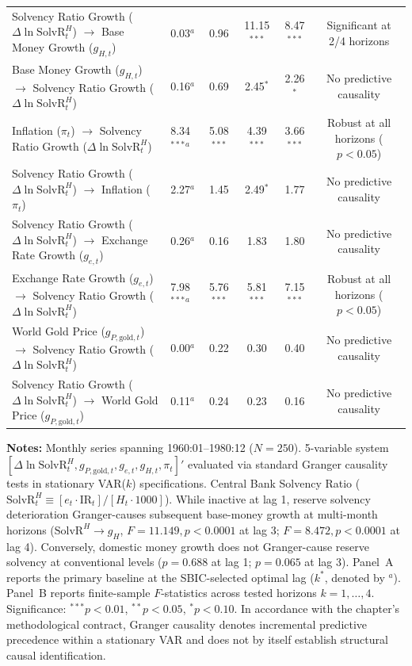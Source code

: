\begin{table}[htbp]
{\begin{tabular}{llccccc}
\midrule
Solvency Ratio Growth ($\Delta \ln \text{SolvR}_t^H$) $\to$ Base Money Growth ($g_{H,t}$) & 0.03$^a$ & 0.96 & 11.15$^{***}$ & 8.47$^{***}$ & \multicolumn{2}{c}{Significant at 2/4 horizons} \\
Base Money Growth ($g_{H,t}$) $\to$ Solvency Ratio Growth ($\Delta \ln \text{SolvR}_t^H$) & 0.16$^a$ & 0.69 & 2.45$^{*}$ & 2.26$^{*}$ & \multicolumn{2}{c}{No predictive causality} \\
Inflation ($\pi_t$) $\to$ Solvency Ratio Growth ($\Delta \ln \text{SolvR}_t^H$) & 8.34$^{***}$$^a$ & 5.08$^{***}$ & 4.39$^{***}$ & 3.66$^{***}$ & \multicolumn{2}{c}{Robust at all horizons ($p < 0.05$)} \\
Solvency Ratio Growth ($\Delta \ln \text{SolvR}_t^H$) $\to$ Inflation ($\pi_t$) & 2.27$^a$ & 1.45 & 2.49$^{*}$ & 1.77 & \multicolumn{2}{c}{No predictive causality} \\
Solvency Ratio Growth ($\Delta \ln \text{SolvR}_t^H$) $\to$ Exchange Rate Growth ($g_{e,t}$) & 0.26$^a$ & 0.16 & 1.83 & 1.80 & \multicolumn{2}{c}{No predictive causality} \\
Exchange Rate Growth ($g_{e,t}$) $\to$ Solvency Ratio Growth ($\Delta \ln \text{SolvR}_t^H$) & 7.98$^{***}$$^a$ & 5.76$^{***}$ & 5.81$^{***}$ & 7.15$^{***}$ & \multicolumn{2}{c}{Robust at all horizons ($p < 0.05$)} \\
World Gold Price ($g_{P,\text{gold},t}$) $\to$ Solvency Ratio Growth ($\Delta \ln \text{SolvR}_t^H$) & 0.00$^a$ & 0.22 & 0.30 & 0.40 & \multicolumn{2}{c}{No predictive causality} \\
Solvency Ratio Growth ($\Delta \ln \text{SolvR}_t^H$) $\to$ World Gold Price ($g_{P,\text{gold},t}$) & 0.11$^a$ & 0.24 & 0.23 & 0.16 & \multicolumn{2}{c}{No predictive causality} \\
\bottomrule
\end{tabular}%
}
\begin{minipage}{0.96\textwidth}
\vspace{0.3em}
\footnotesize \textbf{Notes:} Monthly series spanning 1960:01--1980:12 ($N=250$). 5-variable system $[\Delta \ln \text{SolvR}_t^H, g_{P,\text{gold},t}, g_{e,t}, g_{H,t}, \pi_t]'$ evaluated via standard Granger causality tests in stationary VAR($k$) specifications. Central Bank Solvency Ratio ($\text{SolvR}_t^H \equiv [e_t \cdot \text{IR}_t] / [H_t \cdot 1000]$). While inactive at lag 1, reserve solvency deterioration Granger-causes subsequent base-money growth at multi-month horizons ($\text{SolvR}^H \to g_H$, $F = 11.149, p < 0.0001$ at lag 3; $F = 8.472, p < 0.0001$ at lag 4). Conversely, domestic money growth does not Granger-cause reserve solvency at conventional levels ($p = 0.688$ at lag 1; $p = 0.065$ at lag 3). Panel~A reports the primary baseline at the SBIC-selected optimal lag ($k^*$, denoted by $^a$). Panel~B reports finite-sample $F$-statistics across tested horizons $k = 1, \dots, 4$. Significance: $^{***} p < 0.01$, $^{**} p < 0.05$, $^{*} p < 0.10$. In accordance with the chapter's methodological contract, Granger causality denotes incremental predictive precedence within a stationary VAR and does not by itself establish structural causal identification.
\end{minipage}
\end{table}
